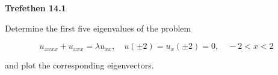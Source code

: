 \textbf{Trefethen 14.1}

Determine the first five eigenvalues of the problem

$$
u_{xxxx} + u_{xxx} = \lambda u_{xx}, \quad u(\pm 2) = u_x(\pm 2) = 0, \quad -2 < x < 2
$$

and plot the corresponding eigenvectors.

\begin{solution}
\end{solution}